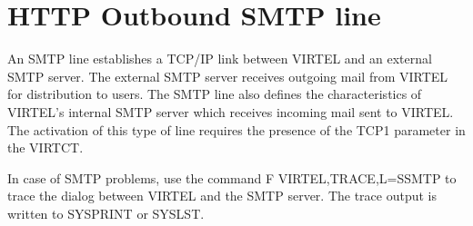 \documentclass[letterpaper,10pt,english]{sphinxmanual}
\begin{document}
\ignorespaces 

\section{HTTP Outbound SMTP line}
\label{\detokenize{connectivity_guide:http-outbound-smtp-line}}\label{\detokenize{connectivity_guide:index-17}}
\sphinxAtStartPar
An SMTP line establishes a TCP/IP link between VIRTEL and an external SMTP server. The external SMTP server receives outgoing mail from VIRTEL for distribution to users. The SMTP line also defines the characteristics of VIRTEL’s internal SMTP server which receives incoming mail sent to VIRTEL.  The activation of this type of line requires the presence of the TCP1 parameter in the VIRTCT.
\begin{description}
\sphinxAtStartPar
In case of SMTP problems, use the command F VIRTEL,TRACE,L=S\sphinxhyphen{}SMTP to trace the dialog between VIRTEL and the SMTP server. The trace output is written to SYSPRINT or SYSLST.

\end{description}

\sphinxAtStartPar
{}

\ignorespaces 
\end{document}
